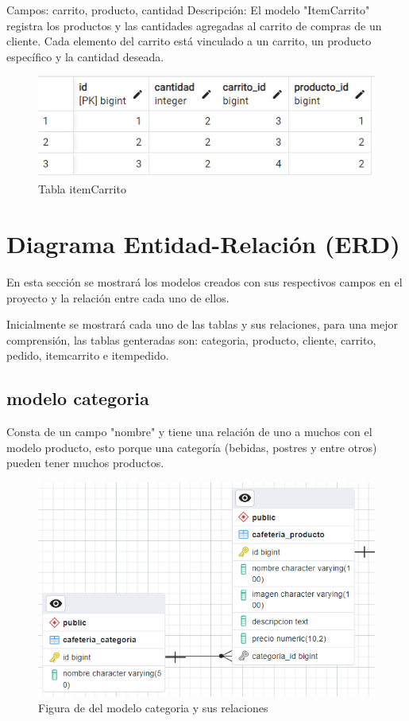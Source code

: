 \documentclass{article}
\begin{document}
\begin{itemize}
	Campos: carrito, producto, cantidad
	Descripción: El modelo "ItemCarrito" registra los productos y las cantidades agregadas al carrito de compras de un cliente. Cada elemento del carrito está vinculado a un carrito, un producto específico y la cantidad deseada.
	\begin{figure}[h!]
		\centering
		\includegraphics[width=.75\linewidth]{img/titemcarrito}
		\caption{Tabla itemCarrito}
		\label{fig:titemcarrito}
	\end{figure}
	
	\end{itemize}
		
	\section{Diagrama Entidad-Relación (ERD)}
	En esta sección se mostrará los modelos creados con sus respectivos campos en el proyecto y la relación entre cada uno de ellos.
	
	Inicialmente se mostrará cada uno de las tablas y sus relaciones, para una mejor comprensión, las tablas genteradas son: categoria, producto, cliente, carrito, pedido, itemcarrito e itempedido.
	
	\subsection{modelo categoria}
	Consta de un campo "nombre" y tiene una relación de uno a muchos con el modelo producto, esto porque una categoría (bebidas, postres y entre otros) pueden tener muchos productos.
	\begin{figure}[h!]
		\centering
		\includegraphics[width=.7\linewidth]{img/modCategoria}
		\caption{Figura de del modelo categoria y sus relaciones}
		\label{fig:modcategoria}
	\end{figure}
	
\end{document}
